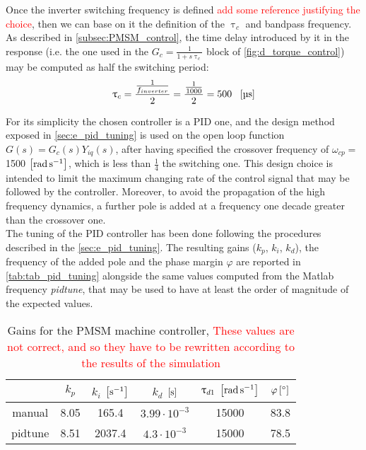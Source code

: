  Once the inverter switching frequency is defined \textcolor{red}{add some reference justifying the choice}, then we can base on it the definition of the $\uptau_c$ and bandpass frequency. As described in \autoref{subsec:PMSM_control}, the time delay introduced by it in the response (i.e. the one used in the $G_c=\frac{1}{1+s\uptau_c}$ block of \autoref{fig:d_torque_control}) may be computed as half the switching period:
 \begin{gather}
 \uptau_{c}=\frac{\frac{1}{f_{inverter}}}{2}=\frac{\frac{1}{1000}}{2}=500 \ \ \left[\si{\micro \second}\right]
 \end{gather}

 For its simplicity the chosen controller is a \acrshort{PID} one, and the design method exposed in \autoref{sec:e_pid_tuning} is used on the open loop function $G(s) = G_c(s)Y_{iq}(s)$, after having specified the crossover frequency of $\omega_{cp}=$1500 $\left[\si{\radian\per\second}\right]$, which is less than $\frac{1}{4}$ the switching one. This design choice is intended to limit the maximum changing rate of the control signal that may be followed by the controller. Moreover, to avoid the propagation of the high frequency dynamics, a further pole is added at a frequency one decade greater than the crossover one. \\
 The tuning of the PID controller has been done following the procedures described  in the \autoref{sec:e_pid_tuning}. The resulting gains ($k_p$, $k_i$, $k_d$), the frequency of the added pole and the phase margin $\varphi$ are reported in \autoref{tab:tab_pid_tuning} alongside the same values computed from the Matlab frequency \textit{pidtune}, that may be used to have at least the order of magnitude of the expected values.
\begin{table}[htb]
    \caption{Gains for the PMSM machine controller, \textcolor{red}{These values are not correct, and so they have to be rewritten according to the results of the simulation}}
     \centering
     \begin{tabular}{cccccc}
     \toprule
          & $k_p$ & $k_i$ $\left[\si{\per\second}\right]$ & $k_d$ $\left[\si{\second}\right]$ & $\uptau_{d1} \ \mesunt{\radian\per\second}$ & $\varphi \left[\si{\degree}\right]$\\ \midrule
         manual & 8.05 & 165.4 & $3.99\cdot 10^{-3}$ & 15000 & 83.8\\
         pidtune & 8.51 & 2037.4 & $4.3\cdot 10^{-3}$ &  15000 & 78.5\\ \bottomrule
     \end{tabular}
 
     \label{tab:tab_pid_tuning}
 \end{table}
 
